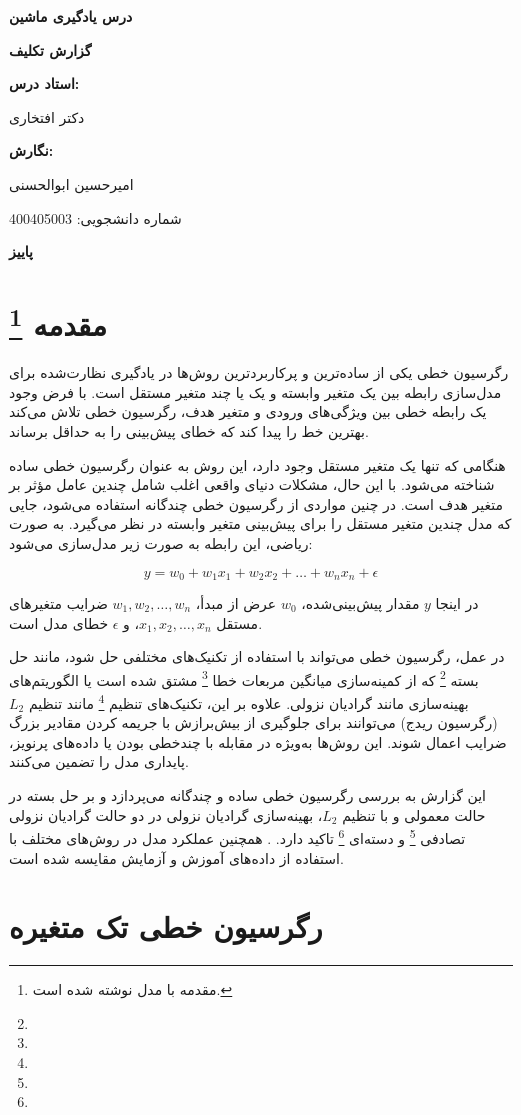 \documentclass{article}
\def\maketitle{
	\begin{titlepage}
		\begin{center}
			\vspace*{2cm}
			
			{\Large\bfseries درس یادگیری ماشین\par}
			\vspace{2cm}
			
			{\Huge\bfseries گزارش تکلیف
				\lr{Linear Regression}\par}
			\vspace{3cm}
			
			{\large\bfseries استاد درس:\par}
			{\large دکتر افتخاری\par}
			\vspace{1.5cm}
			
			{\large\bfseries نگارش:\par}
			{\large امیرحسین ابوالحسنی\par}
			{\large شماره دانشجویی: 400405003\par}
			\vspace{2cm}
			
			\vfill  %
			
			{\large\bfseries پاییز \lr{1403}}
			
		\end{center}
	\end{titlepage}
	\setcounter{page}{1}
}
\begin{document}
	\maketitle	
	\tableofcontents
	\newpage
	\section{مقدمه
		\footnote{مقدمه با مدل  نوشته شده است.}
	}
	
	رگرسیون خطی یکی از ساده‌ترین و پرکاربردترین روش‌ها در یادگیری نظارت‌شده برای مدل‌سازی رابطه بین یک متغیر وابسته و یک یا چند متغیر مستقل است. با فرض وجود یک رابطه خطی بین ویژگی‌های ورودی و متغیر هدف، رگرسیون خطی تلاش می‌کند بهترین خط را پیدا کند که خطای پیش‌بینی را به حداقل برساند.
	
	هنگامی که تنها یک متغیر مستقل وجود دارد، این روش به عنوان رگرسیون خطی ساده شناخته می‌شود. با این حال، مشکلات دنیای واقعی اغلب شامل چندین عامل مؤثر بر متغیر هدف است. در چنین مواردی از رگرسیون خطی چندگانه استفاده می‌شود، جایی که مدل چندین متغیر مستقل را برای پیش‌بینی متغیر وابسته در نظر می‌گیرد. به صورت ریاضی، این رابطه به صورت زیر مدل‌سازی می‌شود:
	
	\[
	y = w_0 + w_1 x_1 + w_2 x_2 + \dots + w_n x_n + \epsilon
	\]
	
	در اینجا \( y \) مقدار پیش‌بینی‌شده، \( w_0 \) عرض از مبدأ، \( w_1, w_2, \dots, w_n \) ضرایب متغیرهای مستقل \( x_1, x_2, \dots, x_n \)، و \( \epsilon \) خطای مدل است.
	
	در عمل، رگرسیون خطی می‌تواند با استفاده از تکنیک‌های مختلفی حل شود، مانند حل بسته
	\footnote{}
	که از کمینه‌سازی میانگین مربعات خطا 
	\footnote{}
	 مشتق شده است یا الگوریتم‌های بهینه‌سازی مانند گرادیان نزولی. علاوه بر این، تکنیک‌های تنظیم 
	 \footnote{}
	  مانند تنظیم \( L_2 \) (رگرسیون ریدج) می‌توانند برای جلوگیری از بیش‌برازش با جریمه کردن مقادیر بزرگ ضرایب اعمال شوند. این روش‌ها به‌ویژه در مقابله با چندخطی بودن یا داده‌های پرنویز، پایداری مدل را تضمین می‌کنند.
	
	این گزارش به بررسی رگرسیون خطی ساده و چندگانه می‌پردازد و بر حل بسته در حالت معمولی و با تنظیم $L_2$، بهینه‌سازی گرادیان نزولی در دو حالت گرادیان نزولی تصادفی
	\footnote{}
	 و دسته‌ای
	 \footnote{}
	 تاکید دارد.
	  . همچنین عملکرد مدل در روش‌های مختلف با استفاده از داده‌های آموزش و آزمایش مقایسه شده است.
	\section{رگرسیون خطی تک متغیره}
\end{document}
